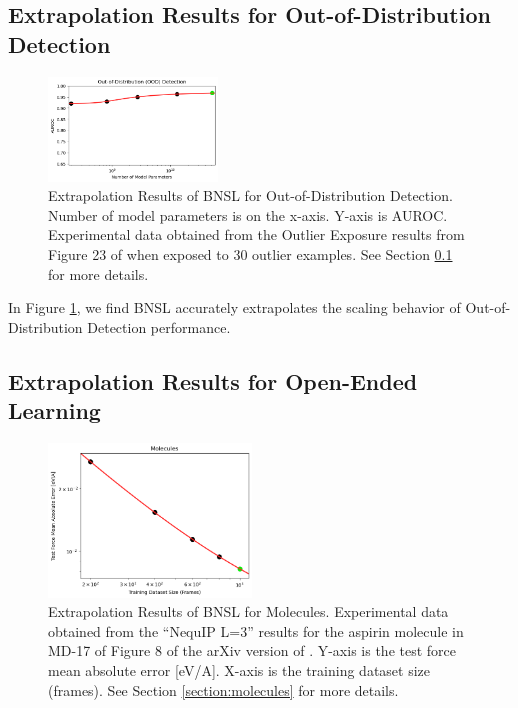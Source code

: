 \documentclass{article} %
\begin{document}

\subsection{Extrapolation Results for Out-of-Distribution Detection}
\label{section:ood_detection}

\begin{figure}[htbp]
    \centering
\includegraphics[width=0.4\textwidth]{figures/ood_detection/ood_detection.png}
    \caption{
Extrapolation Results of BNSL for Out-of-Distribution Detection. Number of model parameters is on the x-axis. Y-axis is AUROC. Experimental data obtained from the Outlier Exposure results from Figure 23 of \cite{bai2022training} when exposed to 30 outlier examples. See Section \ref{section:ood_detection} for more details.
    }
    \label{fig:ood_detection}
\end{figure}

In Figure \ref{fig:ood_detection}, we find BNSL accurately extrapolates the scaling behavior of Out-of-Distribution Detection performance.

\clearpage

\iffalse
\subsection{Extrapolation Results for Open-Ended Learning}
\label{section:open-ended}

\begin{figure}[htbp]
    \centering
\includegraphics[width=0.48\textwidth]{figures/molecules/molecules.png}
    \caption{
Extrapolation Results of BNSL for Molecules. Experimental data obtained from the ``NequIP L=3'' results for the aspirin molecule in MD-17 of Figure 8 of the arXiv version of \cite{Batzner_2022}. Y-axis is the test force mean absolute error [eV/A]. X-axis is the training dataset size (frames). See Section \ref{section:molecules} for more details.
    }
    \label{fig:molecules}
\end{figure}
\end{document}
